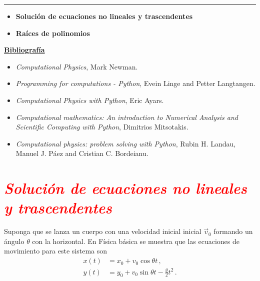 \documentclass[12pt]{article}
\begin{document}
		\thispagestyle{firstpage}
		\vspace*{1.5cm}
	
	\begin{center}
		\rule{\textwidth}{0.4pt}
	\end{center}
	
	\begin{itemize}[leftmargin=*,label=\textcolor{red}{\ensuremath{\blacktriangleright}}]
		\item \textbf{Solución de ecuaciones no lineales y trascendentes}
		\item \textbf{Raíces de polinomios}
	\end{itemize}
	
	\noindent
	\textbf{\underline{Bibliografía}}
	\begin{itemize}[leftmargin=*, label={\textcolor{blue}{$\bullet$}}]
		\item \textit{Computational Physics}, Mark Newman.
        \item \textit{Programming for computations - Python}, Evein Linge and Petter Langtangen. 
        \item \textit{Computational Physics with Python}, Eric Ayars. 
        \item \textit{Computational mathematics: An introduction to 
        Numerical Analysis and Scientific Computing  with Python}, Dimitrios Mitsotakis. 
        \item \textit{Computational physics: problem solving with Python}, 
        Rubin H. Landau, Manuel J. Páez and Cristian C. Bordeianu.
    \end{itemize}
     
    

\section*{\textcolor{red}{\textit{Solución de ecuaciones no lineales y trascendentes}}}

Suponga que se lanza un cuerpo con una velocidad inicial inicial 
$\vec v_0$ formando un ángulo $\theta$ con la horizontal.
En Física básica se muestra que las ecuaciones de movimiento para este
sistema son
\begin{align*}
    x(t) &= x_0 + v_0\cos\theta t\,, \\
    y(t) &= y_0 + v_0\sin\theta t  - \frac{g}{2} t^2 \,.
\end{align*}
\end{document}

